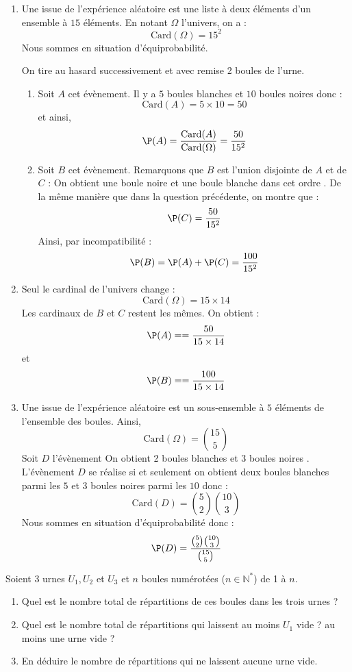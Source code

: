 \documentclass[a4paper,10pt]{report}
\begin{document}
\corr 

\begin{enumerate}
\item Une issue de l'expérience aléatoire est une liste à deux éléments d'un ensemble à $15$ éléments. En notant $\Omega$ l'univers, on a :
$$ \textrm{Card}(\Omega)= 15^2$$
Nous sommes en situation d'équiprobabilité.


On tire au hasard successivement et avec remise 2 boules de l'urne.
\begin{enumerate}
\item Soit $A$ cet évènement. Il y a $5$ boules blanches et $10$ boules noires donc :
$$ \textrm{Card}(A)= 5 \times 10 = 50$$
et ainsi,
$$ \P(A) = \dfrac{\textrm{Card}(A)}{\textrm{Card}(\Omega)} = \dfrac{50}{15^2}$$
\item Soit $B$ cet évènement. Remarquons que $B$ est l'union disjointe de $A$ et de $C$ : \og On obtient une boule noire et une boule blanche dans cet ordre \fg. De la même manière que dans la question précédente, on montre que :
$$ \P(C) = \dfrac{50}{15^2}$$
Ainsi, par incompatibilité :
$$ \P(B) = \P(A)+ \P(C) = \dfrac{100}{15^2}$$
\end{enumerate}
\item Seul le cardinal de l'univers change : 
$$ \textrm{Card}(\Omega)= 15 \times 14$$
Les cardinaux de $B$ et $C$ restent les mêmes. On obtient :
$$ \P(A) =  = \dfrac{50}{15 \times 14}$$
et 
$$ \P(B) =  = \dfrac{100}{15 \times 14}$$
\item Une issue de l'expérience aléatoire est un sous-ensemble à $5$ éléments de l'ensemble des boules. Ainsi,
$$ \textrm{Card}(\Omega)= \binom{15}{5} $$
Soit $D$ l'évènement \og On obtient 2 boules blanches et 3 boules noires \fg. L'évènement $D$ se réalise si et seulement on obtient deux boules blanches parmi les $5$ et $3$ boules noires parmi les $10$ donc :
$$ \textrm{Card}(D) = \binom{5}{2} \binom{10}{3}$$
Nous sommes en situation d'équiprobabilité donc :
$$ \P(D) = \dfrac{\binom{5}{2} \binom{10}{3}}{\binom{15}{5}}$$
\end{enumerate}

\begin{Exa}Soient $3$ urnes $U_1,U_2$ et $U_3$ et $n$ boules numérotées ($n \in \mathbb{N}^*$) de 1 à $n$.
\begin{enumerate}
\item Quel est le nombre total de répartitions de ces boules dans les trois urnes ?
\item Quel est le nombre total de répartitions qui laissent au moins $U_1$ vide ? au moins une urne vide ?
\item En déduire le nombre de répartitions qui ne laissent aucune urne vide.
\end{enumerate}
\end{Exa}
\end{document}
